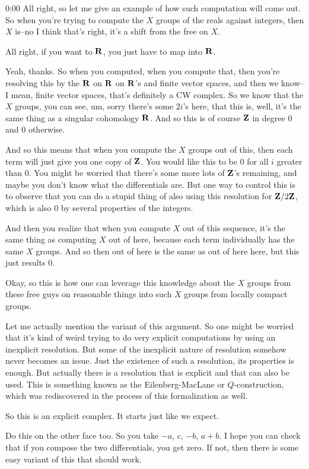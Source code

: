 \begin{unfinished}{0:00}
All right, so let me give an example of how such computation will come out. So when you're trying to compute the $X$ groups of the reals against integers, then $X$ is--no I think that's right, it's a shift from the free on $X$.

All right, if you want to $\mathbf R$, you just have to map into $\mathbf R$.

Yeah, thanks. So when you computed, when you compute that, then you're resolving this by the $\mathbf R$ on $\mathbf R$ on $\mathbf R$'s and finite vector spaces, and then we know--I mean, finite vector spaces, that's definitely a CW complex. So we know that the $X$ groups, you can see, um, sorry there's some $2i$'s here, that this is, well, it's the same thing as a singular cohomology $\mathbf R$. And so this is of course $\mathbf Z$ in degree $0$ and $0$ otherwise.

And so this means that when you compute the $X$ groups out of this, then each term will just give you one copy of $\mathbf Z$. You would like this to be $0$ for all $i$ greater than $0$. You might be worried that there's some more lots of $\mathbf Z$'s remaining, and maybe you don't know what the differentials are. But one way to control this is to observe that you can do a stupid thing of also using this resolution for $\mathbf Z/2\mathbf Z$, which is also $0$ by several properties of the integers.

And then you realize that when you compute $X$ out of this sequence, it's the same thing as computing $X$ out of here, because each term individually has the same $X$ groups. And so then out of here is the same as out of here here, but this just results $0$.

Okay, so this is how one can leverage this knowledge about the $X$ groups from these free guys on reasonable things into such $X$ groups from locally compact groups.

Let me actually mention the variant of this argument. So one might be worried that it's kind of weird trying to do very explicit computations by using an inexplicit resolution. But some of the inexplicit nature of resolution somehow never becomes an issue. Just the existence of such a resolution, its properties is enough. But actually there is a resolution that is explicit and that can also be used. This is something known as the Eilenberg-MacLane or $Q$-construction, which was rediscovered in the process of this formalization as well.

So this is an explicit complex. It starts just like we expect.

Do this on the other face too. So you take $-a$, $c$, $-b$, $a+b$. I hope you can check that if you compose the two differentials, you get zero. If not, then there is some easy variant of this that should work.


\end{unfinished}
